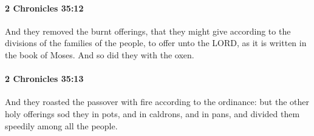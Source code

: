 		\paragraph{2 Chronicles 35:12} %
			\label{2CHRONICLES-35-12}

			And they removed the burnt offerings, that they might give according to the divisions of the families of the people, to offer unto the LORD, as it is written in the book of Moses. And so did they with the oxen.


		\paragraph{2 Chronicles 35:13} %
			\label{2CHRONICLES-35-13}

			And they roasted the passover with fire according to the ordinance: but the other holy offerings sod they in pots, and in caldrons, and in pans, and divided them speedily among all the people.

